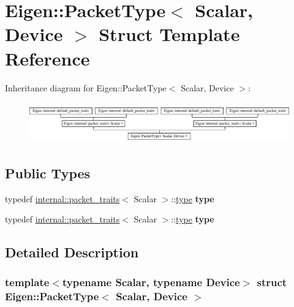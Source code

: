 \hypertarget{struct_eigen_1_1_packet_type}{}\section{Eigen\+:\+:Packet\+Type$<$ Scalar, Device $>$ Struct Template Reference}
\label{struct_eigen_1_1_packet_type}
Inheritance diagram for Eigen\+:\+:Packet\+Type$<$ Scalar, Device $>$\+:\begin{figure}[H]
\begin{center}
\leavevmode
\includegraphics[height=1.764706cm]{struct_eigen_1_1_packet_type}
\end{center}
\end{figure}
\subsection*{Public Types}
\begin{DoxyCompactItemize}
\item 
\mbox{\label{struct_eigen_1_1_packet_type_a3408a66e0894db9cb51e39dbf4fe9f0f}} 
typedef \hyperlink{struct_eigen_1_1internal_1_1packet__traits}{internal\+::packet\+\_\+traits}$<$ Scalar $>$\+::\hyperlink{group___sparse_core___module}{type} {\bfseries type}
\item 
\mbox{\label{struct_eigen_1_1_packet_type_a3408a66e0894db9cb51e39dbf4fe9f0f}} 
typedef \hyperlink{struct_eigen_1_1internal_1_1packet__traits}{internal\+::packet\+\_\+traits}$<$ Scalar $>$\+::\hyperlink{group___sparse_core___module}{type} {\bfseries type}
\end{DoxyCompactItemize}


\subsection{Detailed Description}
\subsubsection*{template$<$typename Scalar, typename Device$>$\newline
struct Eigen\+::\+Packet\+Type$<$ Scalar, Device $>$}



